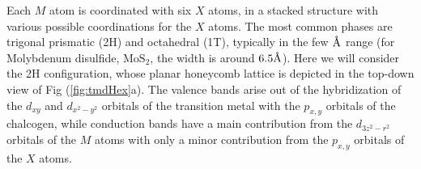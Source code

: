 Each $M$ atom is coordinated with six $X$ atoms, in a stacked structure with various possible coordinations for the $X$ atoms.
The most common phases are trigonal prismatic (2H) and octahedral (1T), typically in the few $\textup{\AA}$ range (for Molybdenum disulfide, $\text{Mo}\text{S}_2$, the width is around $6.5 \textup{\AA}$).
Here we will consider the 2H configuration, whose planar honeycomb lattice is depicted in the top-down view of Fig (\ref{fig:tmdHex}a).
The valence bands arise out of the hybridization of the $d_{xy}$ and $d_{x^2 - y^2}$ orbitals of the transition metal with the $p_{x, y}$ orbitals of the chalcogen, while conduction bands have a main contribution from the $d_{3z^2 - r^2}$ orbitals of the $M$ atoms with only a minor contribution from the $p_{x, y}$ orbitals of the $X$ atoms.

